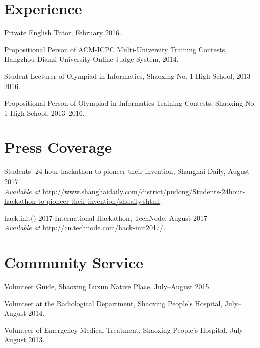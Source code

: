 \documentclass[letterpaper]{article}
\renewenvironment{itemize}{
  \begin{list}{}{
    \setlength{\leftmargin}{1.5em}
  }
}{
  \end{list}
}
\begin{document}
\section*{Experience}

\begin{itemize}
  \item Private English Tutor, February 2016.

  \item Propositional Person of ACM-ICPC Multi-University Training Contests, Hangzhou Dianzi University Online Judge System, 2014.

  \item Student Lecturer of Olympiad in Informatics, Shaoxing No. 1 High School, 2013--2016.
 
  \item Propositional Person of Olympiad in Informatics Training Contests, Shaoxing No. 1 High School, 2013--2016.
\end{itemize}


\section*{Press Coverage}

\begin{itemize}
  \item Students' 24-hour hackathon to pioneer their invention, Shanghai Daily, August 2017 \\
  \emph{Available at }\url{http://www.shanghaidaily.com/district/pudong/Students-24hour-hackathon-to-pioneer-their-invention/shdaily.shtml}\emph{.}

  \item hack.init() 2017 International Hackathon, TechNode, August 2017 \\
  \emph{Available at }\url{http://cn.technode.com/hack-init2017/}\emph{.}
\end{itemize}


\section*{Community Service}

\begin{itemize}
  \item Volunteer Guide, Shaoxing Luxun Native Place, July--August 2015.

  \item Volunteer at the Radiological Department, Shaoxing People's Hospital, July--August 2014.

  \item Volunteer of Emergency Medical Treatment, Shaoxing People's Hospital, July--August 2013.

\end{itemize}
\end{document}
